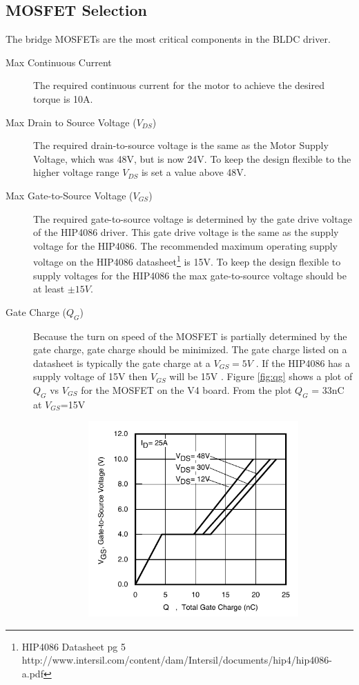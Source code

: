 \documentclass{article}
\begin{document}
\subsection{MOSFET Selection}
The bridge MOSFETs are the most critical components in the BLDC driver. 
\begin{description}
\item[Max Continuous Current]
The required continuous current for the motor to achieve the desired torque is 10A. 
\item[Max Drain to Source Voltage ($V_{DS}$)] The required drain-to-source voltage is the same as the Motor Supply Voltage, which was 48V, but is now 24V. To keep the design flexible to the higher voltage range $V_{DS}$ is set a value above 48V. 
\item[Max Gate-to-Source Voltage ($V_{GS}$)] The required gate-to-source voltage is determined by the gate drive voltage of the HIP4086 driver. This gate drive voltage is the same as the supply voltage for the HIP4086. The recommended maximum operating supply voltage on the HIP4086 datasheet\footnote{\raggedright HIP4086 Datasheet pg 5 http://www.intersil.com/content/dam/Intersil/documents/hip4/hip4086-a.pdf} is 15V. To keep the design flexible to supply voltages for the HIP4086 the max gate-to-source voltage should be at least $\pm15V$. 
\item[Gate Charge ($Q_G$)] Because the turn on speed of the MOSFET is partially determined by the gate charge, gate charge should be minimized. The gate charge listed on a datasheet is typically the gate charge at a $V_{GS}= 5V$ . If the HIP4086 has a supply voltage of 15V then $V_{GS}$ will be 15V . Figure \ref{fig:qg} shows a plot of $Q_G$ vs $V_{GS}$ for the MOSFET on the V4 board. From the plot $Q_G$ = 33nC at $V_{GS}$=15V
\begin{figure}[h]
	\begin{subfigure}{0.4\textwidth}
		\includegraphics[width=\textwidth]{qg}

\end{subfigure}
\end{figure}
\end{description}
\end{document}
